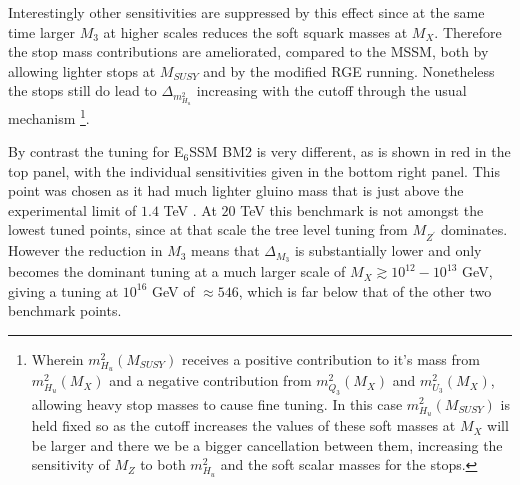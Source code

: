 \documentclass[preprint,amsmath,amssymb,aps,superscriptaddress,prd,showpacs,floatfix,nofootinbib]{revtex4-1}
\begin{document}
Interestingly other sensitivities are suppressed by this effect since
at the same time larger $M_3$ at higher scales reduces the soft squark
masses at $M_X$.  Therefore the stop mass contributions are
ameliorated, compared to the MSSM, both by allowing lighter stops at
$M_{SUSY}$ and by the modified RGE running.  Nonetheless the stops
still do lead to $\Delta_{m_{H_u}^2}$ increasing with the cutoff
through the usual mechanism \footnote{Wherein $m_{H_u}^2(M_{SUSY})$
  receives a positive contribution to it's mass from $m_{H_u}^2(M_X)$
  and a negative contribution from $m_{Q_3}^2(M_X)$ and
  $m_{U_3}^2(M_X)$, allowing heavy stop masses to cause fine
  tuning. In this case $m_{H_u}^2(M_{SUSY})$ is held fixed so as the
  cutoff increases the values of these soft masses at $M_X$ will be
  larger and there we be a bigger cancellation between them,
  increasing the sensitivity of $M_Z$ to both $m_{H_u}^2$ and the soft
  scalar masses for the stops.}.


By contrast the tuning for E$_6$SSM BM2 is very different, as is shown
in red in the top panel, with the individual sensitivities given in the
bottom right panel. This point was chosen as it had much lighter
gluino mass that is just above the experimental limit of $1.4$ TeV
\cite{Aad:2014lra}.  At $20$ TeV this benchmark is not amongst the
lowest tuned points, since at that scale the tree level tuning from
$M_{Z^\prime}$ dominates.  However the reduction in $M_3$ means that
$\Delta_{M_3}$ is substantially lower and only becomes the dominant
tuning at a much larger scale of $M_X\gtrsim 10^{12}-10^{13}$ GeV,
giving a tuning at $10^{16}$ GeV of $\approx 546$, which is far below
that of the other two benchmark points.
\end{document}
